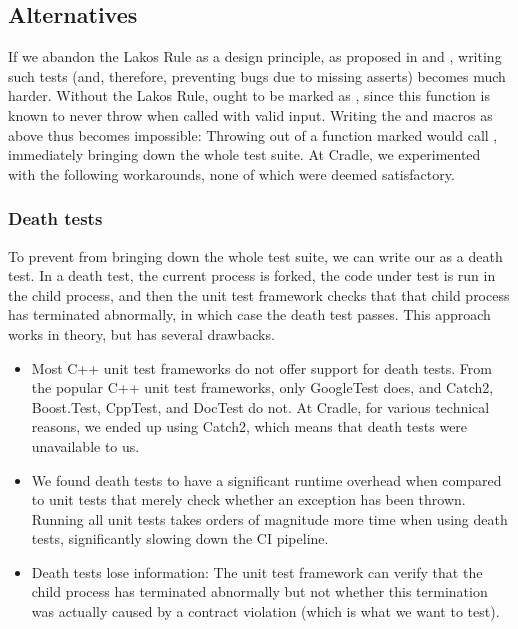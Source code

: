 \subsection{Alternatives}

If we abandon the Lakos Rule as a design principle, as proposed in \cite{P1656R2} and \cite{P2148R0}, writing such tests (and, therefore, preventing bugs due to missing asserts) becomes much harder. Without the Lakos Rule,  ought to be marked as , since this function is known to never throw when called with valid input. Writing the  and  macros as above thus becomes impossible: Throwing  out of a function marked  would call , immediately bringing down the whole test suite. At Cradle, we experimented with the following workarounds, none of which were deemed satisfactory.

\subsubsection{Death tests}

To prevent  from bringing down the whole test suite, we can write our  as a death test. In a death test, the current process is forked, the code under test is run in the child process, and then the unit test framework checks that that child process has terminated abnormally, in which case the death test passes. This approach works in theory, but has several drawbacks.
\begin{itemize}
\item Most C++ unit test frameworks do not offer support for death tests. From the popular C++ unit test frameworks, only GoogleTest does, and Catch2, Boost.Test, CppTest, and DocTest do not. At Cradle, for various technical reasons, we ended up using Catch2, which means that death tests were unavailable to us.
\item We found death tests to have a significant runtime overhead when compared to unit tests that merely check whether an exception has been thrown. Running all unit tests takes orders of magnitude more time when using death tests, significantly slowing down the CI pipeline.
\item Death tests lose information: The unit test framework can verify that the child process has terminated abnormally but not whether this termination was actually caused by a contract violation (which is what we want to test).
\end{itemize}

